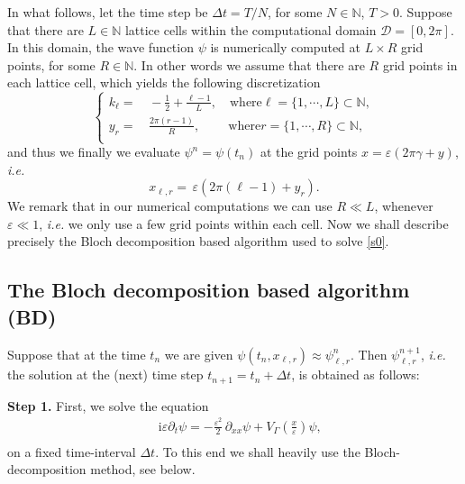 \documentclass[leqno,final]{siamltex}
\numberwithin{equation}{section}
\newcounter{me}
\begin{document}
In what follows, let the time step be $\Delta t=T/N$, for some
$N\in {{\mathbb N }}$, $T>0$. Suppose that there are $L\in {{\mathbb N }}$ lattice cells
within the computational domain $\mathcal D=[0,2\pi]$. In this
domain, the wave function $\psi$ is numerically computed at $L
\times R$ grid points, for some $R \in {{\mathbb N }}$. In other words we
assume that there are $R$ grid points in each lattice cell, which
yields the following discretization \begin{equation} \left \{
\begin{aligned}
k_\ell=& \, -{\frac{{1}}{{2}}}+{\frac{{\ell-1}}{{L}}},\quad  \mbox{where
$\ell=\{1,\cdots,L\}\subset {{\mathbb N }}$},\\
y_r=&\, {\frac{{2\pi (r-1)}}{{R}}},\quad \quad  \ \mbox{where
$r=\{1,\cdots, R\}\subset {{\mathbb N }}$}, \\
\end{aligned}
\right. \end{equation} and thus we finally we evaluate $\psi^n = \psi(t_n)$
at the grid points $x = {{\varepsilon }}(2\pi {\gamma} + y)$, {{\sl i.e.\/ }} \begin{equation} x_{\ell,r}= \,
{{\varepsilon }}(2\pi (\ell - 1)+y_r). \end{equation} We remark that in our numerical
computations we can use $R \ll L$, whenever ${{\varepsilon }} \ll 1$, {{\sl i.e.\/ }} we
only use a few grid points within each cell. Now we shall describe
precisely the Bloch decomposition based algorithm used to solve
\eqref{s0}.

\subsection{The Bloch decomposition based algorithm (BD)}

Suppose that at the time $t_n$ we are given
$\psi(t_n,x_{\ell,r})\approx \psi^n_{\ell,r}$. Then
$\psi^{n+1}_{\ell,r}$, {{\sl i.e.\/ }} the solution at the (next) time step
$t_{n+1}=t_n+\Delta t$, is obtained as follows:

\textbf{Step 1.} First, we solve the equation
\begin{equation}
\label{bd1}
\begin{aligned}
&\, {\mathrm{i}} {{\varepsilon }} \partial _t\psi = -\frac{{{\varepsilon }}^2}{2}\, {\partial}_{xx}\psi
+V_{\Gamma}\left({\frac{{x}}{{{\varepsilon }}}}\right)\psi, \\
\end{aligned}
\end{equation}
on a fixed time-interval $\Delta t$. To this end we shall heavily
use the Bloch-decomposition method, see below.
\end{document}
